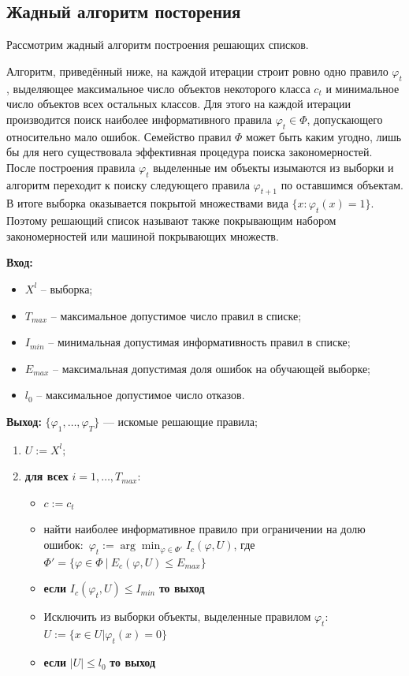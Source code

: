 \subsection{Жадный алгоритм посторения}
Рассмотрим жадный алгоритм построения решающих списков.

Алгоритм, приведённый ниже, на каждой итерации строит ровно одно правило $\varphi_t$, выделяющее максимальное число объектов некоторого класса $c_t$ и минимальное число объектов
всех остальных классов. Для этого на каждой итерации производится поиск наиболее информативного правила $\varphi_t \in \Phi$, допускающего относительно мало ошибок. Семейство
правил $\Phi$ может быть каким угодно, лишь бы для него существовала эффективная
процедура поиска закономерностей. После построения правила $\varphi_t$ выделенные им объекты изымаются из выборки и алгоритм переходит к поиску следующего правила $\varphi_{t+1}$ по оставшимся объектам. В итоге выборка оказывается покрытой
множествами вида $\{x: \varphi_t(x) = 1\}$. Поэтому решающий список называют также покрывающим набором закономерностей или машиной покрывающих множеств.

\hline
\textbf{Вход:}
\begin{itemize}
    \item $X^l$ -- выборка;
    \item $T_{max}$ -- максимальное допустимое число правил в списке;
    \item $I_{min}$ -- минимальная допустимая информативность правил в списке;
    \item $E_{max}$ -- максимальная допустимая доля ошибок на обучающей выборке;
    \item $l_0$ -- максимальное допустимое число отказов.
\end{itemize}

\textbf{Выход:}
 $\{\varphi_1, \dots, \varphi_T\} \text{ — искомые решающие правила;}$

\hline
\begin{enumerate}
    \item $U := X^l;$
    \item \textbf{для всех} $i = 1, \dots, T_{max}$:
    \begin{itemize}
        \item {} $c := c_t$
        \item найти наиболее информативное правило при ограничении на долю ошибок:\
        $\varphi_t := \arg\min_{\varphi \in \Phi'} I_c(\varphi, U)$, где $\Phi' = \{ \varphi \in \Phi \ | \ E_c(\varphi, U) \leq E_{max} \}$ 

        \item \textbf{если} $I_c(\varphi_t, U) \leq I_{min}$ \textbf{то выход}
        \item Исключить из выборки объекты, выделенные правилом $\varphi_t$:
        $U := \{x \in U | \varphi_t(x) = 0\}$

        \item \textbf{если} $|U| \leq l_0$ \textbf{то выход}
    \end{itemize}
\end{enumerate}
\hline


